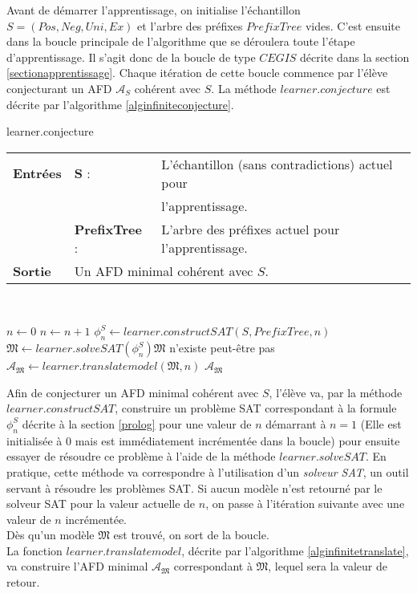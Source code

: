 \documentclass[12pt,a4paper,oneside,titlepage]{report}
\begin{document}
\noindent Avant de démarrer l'apprentissage, on initialise l'échantillon $S=(Pos,Neg,Uni,Ex)$ et l'arbre des préfixes $PrefixTree$ vides. C'est ensuite dans la boucle principale de l'algorithme que se déroulera toute l'étape d'apprentissage. Il s'agit donc de la boucle de type $CEGIS$ décrite dans la section \ref{sectionapprentissage}. Chaque itération de cette boucle commence par l'élève conjecturant un AFD $\mathcal{A}_S$ cohérent avec $S$. La méthode $learner.conjecture$ est décrite par l'algorithme \ref{alginfiniteconjecture}.

\begin{algorithm}[H]
\caption{learner.conjecture}\label{alginfiniteconjecture}
\hspace*{\algorithmicindent} 
\begin{tabular}{lll}
	\textbf{Entrées} & \textbf{S} : &L'échantillon (sans contradictions) actuel pour\\
	&&l'apprentissage.\\
	&\textbf{PrefixTree} : &L'arbre des préfixes actuel pour l'apprentissage.\\
	\textbf{Sortie} &\multicolumn{2}{l}{Un AFD minimal cohérent avec $S$.}\\
\end{tabular}\\
\begin{algorithmic}[1]
\State $n\gets 0$
\Repeat
	\State $n\gets n+1$
	\State $\phi_n^S\gets learner.constructSAT(S,PrefixTree,n)$
	\State $\mathfrak{M} \gets learner.solveSAT(\phi_n^S)$\Comment $\mathfrak{M}$ n'existe peut-être pas
\State $\mathcal{A}_\mathfrak{M}\gets learner.translatemodel(\mathfrak{M},n)$
\State\Return $\mathcal{A}_\mathfrak{M}$
\end{algorithmic}
\end{algorithm}
Afin de conjecturer un AFD minimal cohérent avec $S$, l'élève va, par la méthode $learner.constructSAT$, construire un problème SAT correspondant à la formule $\phi_n^S$ décrite à la section \ref{prolog} pour une valeur de $n$ démarrant à $n=1$ (Elle est initialisée à $0$ mais est immédiatement incrémentée dans la boucle) pour ensuite essayer de résoudre ce problème à l'aide de la méthode $learner.solveSAT$. En pratique, cette méthode va correspondre à l'utilisation d'un \emph{solveur SAT}, un outil servant à résoudre les problèmes SAT. Si aucun modèle n'est retourné par le solveur SAT pour la valeur actuelle de $n$, on passe à l'itération suivante avec une valeur de $n$ incrémentée.\\
Dès qu'un modèle $\mathfrak{M}$ est trouvé, on sort de la boucle.\\
La fonction $learner.translatemodel$, décrite par l'algorithme \ref{alginfinitetranslate}, va construire l'AFD minimal $\mathcal{A}_\mathfrak{M}$ correspondant à $\mathfrak{M}$, lequel sera la valeur de retour.\\
\end{document}
